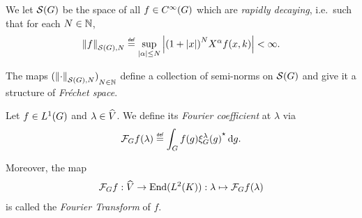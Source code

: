 \begin{definition}
    We let $\Schwartz\Group$ be the space of all $f \in \SmoothFunctions\Group$
    which are \emph{rapidly decaying},
    i.e.\ such that for each $N \in \N$,
    \begin{align*}
        \seminorm[\Schwartz\Group]{N}{f} \defeq
        \sup_{\abs\alpha \leq N}
        \abs{%
            {(1 + \abs{x})}^N
            \LeftDifferentialOperator{\alpha} f(x, k)
        }
        < \infty.
    \end{align*}

    The maps ${(\seminorm[\Schwartz\Group]{N}{\dummy})}_{N \in \N}$ define a collection of semi-norms on $\Schwartz\Group$
    and give it a structure of \emph{Fr\'echet space}.
\end{definition}

\begin{definition}
\label{definition:Fourier_Transform}
    Let $f \in \Lebesgue{1}{\Group}$ and $\lambda \in \dualGroup{\VectorSpace}$.
    We define its \emph{Fourier coefficient} at $\lambda$ via
    \begin{align*}
        \Fourier{f}(\lambda) \defeq \int_\Group f(g) \adj{\Rep{\lambda}(g)} \dd g.
    \end{align*}

    Moreover, the map
    \begin{align*}
        \Fourier{f} : \dualGroup{\VectorSpace} \to \End(\Lebesgue{2}{\CompactGroup}) :
        \lambda \mapsto \Fourier{f}(\lambda)
    \end{align*}
    is called the \emph{Fourier Transform} of $f$.
\end{definition}

